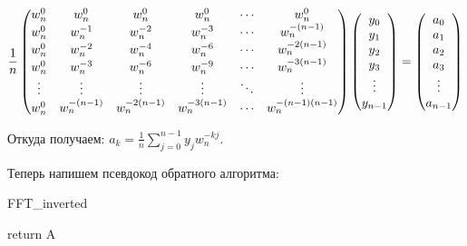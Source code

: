 \documentclass[a4paper, 12pt]{article}
\begin{document}
\[
  \frac{1}{n}
  \begin{pmatrix}
    w_n^0 & w_n^0 & w_n^0 & w_n^0 & \cdots & w_n^0 \cr 
    w_n^0 & w_n^{-1} & w_n^{-2} & w_n^{-3} & \cdots & w_n^{-(n-1)} \cr 
    w_n^0 & w_n^{-2} & w_n^{-4} & w_n^{-6} & \cdots & w_n^{-2(n-1)} \cr 
    w_n^0 & w_n^{-3} & w_n^{-6} & w_n^{-9} & \cdots & w_n^{-3(n-1)} \cr 
    \vdots & \vdots & \vdots & \vdots & \ddots & \vdots \cr 
    w_n^0 & w_n^{-(n-1)} & w_n^{-2(n-1)} & w_n^{-3(n-1)} & \cdots & w_n^{-(n-1)(n-1)}
  \end{pmatrix}
  \begin{pmatrix}
    y_0 \cr 
    y_1 \cr 
    y_2 \cr 
    y_3 \cr 
    \vdots \cr 
    y_{n-1}
  \end{pmatrix}
  =
  \begin{pmatrix}
    a_0 \cr 
    a_1 \cr 
    a_2 \cr 
    a_3 \cr 
    \vdots \cr 
    a_{n-1}
  \end{pmatrix}
\]

Откуда получаем: $a_k = \frac{1}{n}\sum_{j = 0}^{n - 1} y_jw_n^{-kj}$.

Теперь напишем псевдокод обратного алгоритма:

\begin{algorithm}
  \caption{FFT\_inverted}
  \begin{algorithmic}[1]
     
    \EndIf
       
       
    \EndFor
    \State return A
    \EndFunction
  \end{algorithmic}
\end{algorithm}
\end{document}
